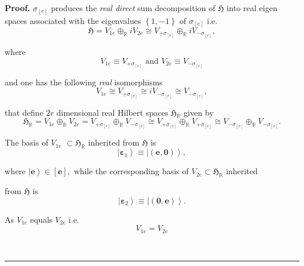 \documentclass[aps,preprint]{revtex4}
\newenvironment{proof}[1][Proof]{\noindent\textbf{#1.} }{\ \rule{0.5em}{0.5em}}
\begin{document}
\begin{proof}
$\sigma_{\left[ e\right] }$ produces the \emph{real direct} sum
decomposition of $\mathfrak{H}$ into real eigen spaces associated with the
eigenvalues $\left\{ 1,-1\right\} $ of $\sigma_{\left[ e\right] }$ i.e.%
\begin{equation}
\mathfrak{H}=V_{1e}\oplus_{\mathbb{R}}iV_{2e}\cong V_{+\sigma_{\left[ e%
\right] }}\oplus_{\mathbb{R}}iV_{-\sigma_{\left[ e\right] }},
\end{equation}

where 
\begin{equation}
V_{1e}\equiv V_{+\sigma_{\left[ e\right] }}\text{ and }V_{2e}\equiv
V_{-\sigma_{\left[ e\right] }}
\end{equation}

and one has the following \emph{real} isomorphisms 
\begin{equation}
V_{1e}\cong V_{+\sigma_{\left[ e\right] }}\cong iV_{-\sigma_{\left[ e\right]
}}\cong V_{-\sigma_{\left[ e\right] }},
\end{equation}

that define $2r$ dimensional real Hilbert spaces $\mathfrak{H}_{\mathbb{R}}$
given by 
\begin{equation}
\mathfrak{H}_{\mathbb{R}}=V_{1e}\oplus_{\mathbb{R}}V_{2e}=V_{+\sigma_{\left[
e\right] }}\oplus_{\mathbb{R}}V_{-\sigma_{\left[ e\right] }}\cong
V_{+\sigma_{\left[ e\right] }}\oplus_{\mathbb{R}}V_{+\sigma_{\left[ e\right]
}}\cong V_{-\sigma_{\left[ e\right] }}\oplus_{\mathbb{R}}V_{-\sigma_{\left[ e%
\right] }}.
\end{equation}

The basis of $V_{1e}$ $\subset\mathfrak{H}_{\mathbb{R}}$ inherited from $%
\mathfrak{H}$ is 
\begin{equation}
\left\vert \mathbf{\varepsilon}_{1}\right\rangle \equiv\left\vert \left( 
\mathbf{e},\mathbf{0}\right) \right\rangle ,
\end{equation}

where $\left\vert \mathbf{e}\right\rangle \in\left[ \mathbf{e}\right] ,$
while the corresponding basis of $V_{2e}\subset\mathfrak{H}_{\mathbb{R}}$
inherited

from $\mathfrak{H}$ is 
\begin{equation}
\left\vert \mathbf{\varepsilon}_{2}\right\rangle \equiv\left\vert \left( 
\mathbf{0,e}\right) \right\rangle .
\end{equation}

As $V_{1e}$ equals $V_{2e}$ i.e. 
\begin{equation}
V_{1e}=V_{2e}
\end{equation}


\end{proof}
\end{document}

